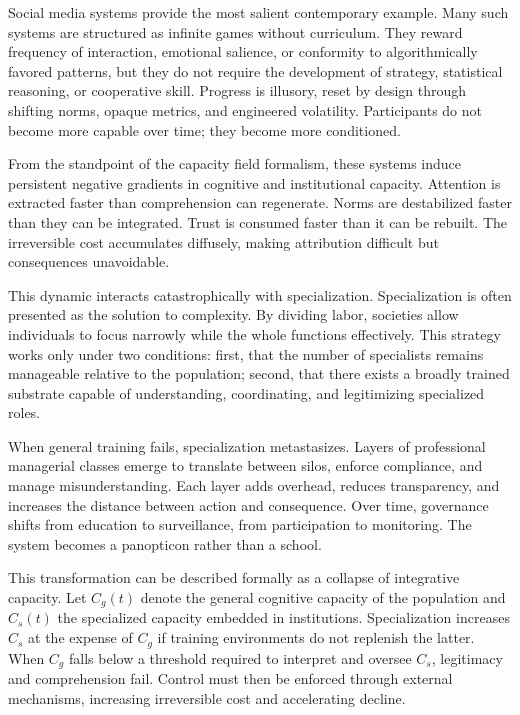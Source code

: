 \documentclass[12pt,oneside]{book}
\begin{document}
Social media systems provide the most salient contemporary example. Many such systems are structured as infinite games without curriculum. They reward frequency of interaction, emotional salience, or conformity to algorithmically favored patterns, but they do not require the development of strategy, statistical reasoning, or cooperative skill. Progress is illusory, reset by design through shifting norms, opaque metrics, and engineered volatility. Participants do not become more capable over time; they become more conditioned.

From the standpoint of the capacity field formalism, these systems induce persistent negative gradients in cognitive and institutional capacity. Attention is extracted faster than comprehension can regenerate. Norms are destabilized faster than they can be integrated. Trust is consumed faster than it can be rebuilt. The irreversible cost accumulates diffusely, making attribution difficult but consequences unavoidable.

This dynamic interacts catastrophically with specialization. Specialization is often presented as the solution to complexity. By dividing labor, societies allow individuals to focus narrowly while the whole functions effectively. This strategy works only under two conditions: first, that the number of specialists remains manageable relative to the population; second, that there exists a broadly trained substrate capable of understanding, coordinating, and legitimizing specialized roles.

When general training fails, specialization metastasizes. Layers of professional managerial classes emerge to translate between silos, enforce compliance, and manage misunderstanding. Each layer adds overhead, reduces transparency, and increases the distance between action and consequence. Over time, governance shifts from education to surveillance, from participation to monitoring. The system becomes a panopticon rather than a school.

This transformation can be described formally as a collapse of integrative capacity. Let \(C_g(t)\) denote the general cognitive capacity of the population and \(C_s(t)\) the specialized capacity embedded in institutions. Specialization increases \(C_s\) at the expense of \(C_g\) if training environments do not replenish the latter. When \(C_g\) falls below a threshold required to interpret and oversee \(C_s\), legitimacy and comprehension fail. Control must then be enforced through external mechanisms, increasing irreversible cost and accelerating decline.
\end{document}
